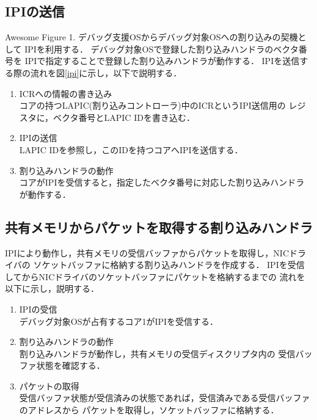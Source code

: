 \documentclass[tanilab-enum]{graduate}
\begin{document}
\subsection{IPIの送信}
{Awesome Figure 1.}
デバッグ支援OSからデバッグ対象OSへの割り込みの契機として
IPIを利用する．
デバッグ対象OSで登録した割り込みハンドラのベクタ番号を
IPIで指定することで登録した割り込みハンドラが動作する．
IPIを送信する際の流れを図\ref{ipi}に示し，以下で説明する．
\begin{enumerate}
    \item ICRへの情報の書き込み\\
        コアの持つLAPIC(割り込みコントローラ)中のICRというIPI送信用の
        レジスタに，ベクタ番号とLAPIC IDを書き込む．
    \item IPIの送信\\
        LAPIC IDを参照し，このIDを持つコアへIPIを送信する．
    \item 割り込みハンドラの動作\\
        コアがIPIを受信すると，指定したベクタ番号に対応した割り込みハンドラが動作する．
\end{enumerate}
\subsection{共有メモリからパケットを取得する割り込みハンドラ}
IPIにより動作し，共有メモリの受信バッファからパケットを取得し，NICドライバの
ソケットバッファに格納する割り込みハンドラを作成する．
IPIを受信してからNICドライバのソケットバッファにパケットを格納するまでの
流れを以下に示し，説明する．
\begin{enumerate}
    \item IPIの受信\\
        デバッグ対象OSが占有するコア1がIPIを受信する．
    \item 割り込みハンドラの動作\\
        割り込みハンドラが動作し，共有メモリの受信ディスクリプタ内の
        受信バッファ状態を確認する．
    \item パケットの取得\\
        受信バッファ状態が受信済みの状態であれば，受信済みである受信バッファのアドレスから
        パケットを取得し，ソケットバッファに格納する．
\end{enumerate}
\end{document}
